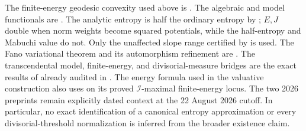 The finite-energy geodesic convexity used above is
\cite[Theorem~1.2]{BDL17}.  The algebraic and model functionals are
\cite[Definitions~7.13/7.20 and Propositions~7.14--7.22]{BHJ17}.
The analytic entropy is half the ordinary entropy by
\cite[equation~(1.10)]{BHJ19}; $E,J$ double when norm weights become
squared potentials, while the half-entropy and Mabuchi value do not.
Only
the unaffected slope range certified by \cite{BHJ19err} is used.
The Fano variational theorem and its automorphism refinement are
\cite[Theorem~A and Corollary~5.2]{BBJ21}. The transcendental
model, finite-energy, and divisorial-measure bridges are the exact
results of \cite{MP24,MPWN25} already audited in
. The energy formula used in the
valuative construction also uses \cite{DXZ23} on its proved
$\mathcal I$-maximal finite-energy locus. The two 2026 preprints
\cite{BJ26ComplexNA,Trusiani26} remain explicitly dated context at the
22 August 2026 cutoff. In particular, no exact identification of a
canonical entropy approximation or every divisorial-threshold normalization
is inferred from the broader existence claim.

